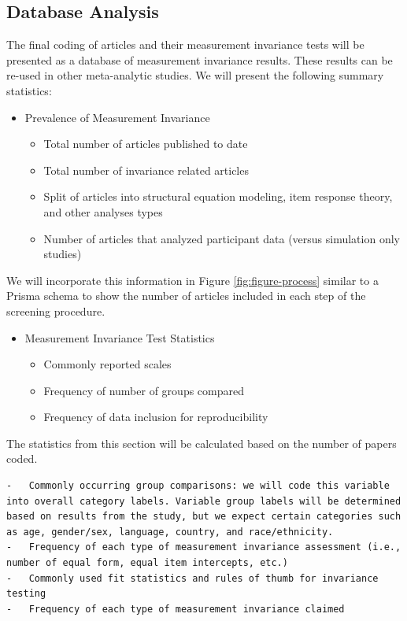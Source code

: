\documentclass[
  man]{apa7}
\providecommand{\tightlist}{%
  \setlength{\itemsep}{0pt}\setlength{\parskip}{0pt}}
\begin{document}
\subsection{Database Analysis}\label{database-analysis}

The final coding of articles and their measurement invariance tests will be presented as a database of measurement invariance results. These results can be re-used in other meta-analytic studies. We will present the following summary statistics:

\begin{itemize}
\tightlist
\item
  Prevalence of Measurement Invariance

  \begin{itemize}
  \tightlist
  \item
    Total number of articles published to date
  \item
    Total number of invariance related articles
  \item
    Split of articles into structural equation modeling, item response theory, and other analyses types
  \item
    Number of articles that analyzed participant data (versus simulation only studies)
  \end{itemize}
\end{itemize}

We will incorporate this information in Figure \ref{fig:figure-process} similar to a Prisma schema to show the number of articles included in each step of the screening procedure.

\begin{itemize}
\tightlist
\item
  Measurement Invariance Test Statistics

  \begin{itemize}
  \tightlist
  \item
    Commonly reported scales
  \item
    Frequency of number of groups compared
  \item
    Frequency of data inclusion for reproducibility
  \end{itemize}
\end{itemize}

The statistics from this section will be calculated based on the number of papers coded.

\begin{verbatim}
-   Commonly occurring group comparisons: we will code this variable into overall category labels. Variable group labels will be determined based on results from the study, but we expect certain categories such as age, gender/sex, language, country, and race/ethnicity. 
-   Frequency of each type of measurement invariance assessment (i.e., number of equal form, equal item intercepts, etc.)
-   Commonly used fit statistics and rules of thumb for invariance testing
-   Frequency of each type of measurement invariance claimed
\end{verbatim}
\end{document}
